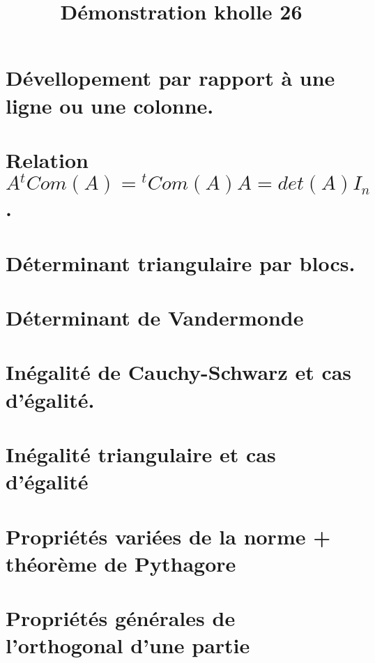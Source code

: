 \documentclass{article}
\begin{document}
\title{Démonstration kholle 26}
\date{}
\maketitle
\renewcommand{\thesection}{\Roman{section}}
\setlength{\parindent}{1.5cm}
\section{Dévellopement par rapport à une ligne ou une colonne.}
\section{Relation $A {}^tCom(A)={}^tCom(A)A=det(A)I_n$.}
\section{Déterminant triangulaire par blocs.}
\section{Déterminant de Vandermonde}
\section{Inégalité de Cauchy-Schwarz et cas d'égalité.}
\section{Inégalité triangulaire et cas d'égalité}
\section{Propriétés variées de la norme + théorème de Pythagore}
\section{Propriétés générales de l'orthogonal d'une partie}
\end{document}
